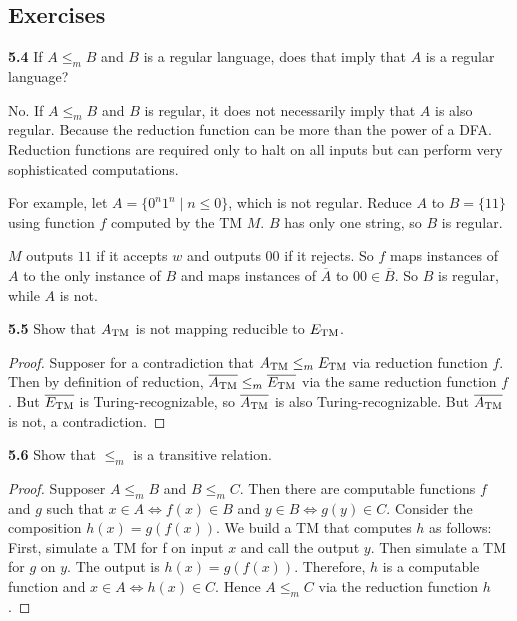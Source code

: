 \subsection{Exercises}

\textbf{5.4} If $A \leq_m B$ and $B$ is a regular language, does that imply that $A$ is a regular language?
\begin{mdframed}
No. If $A \leq_m B$ and $B$ is regular, it does not necessarily imply that $A$ is also regular. Because the reduction function can be more than the power of a DFA. Reduction functions are required only to halt on all inputs but can perform very sophisticated computations.

For example, let $A = \{0^n 1^n \mid n \leq 0\}$, which is not regular. Reduce $A$ to $B = \{11\}$ using function $f$ computed by the TM $M$. $B$ has only one string, so $B$ is regular.

$M$ outputs $11$ if it accepts $w$ and outputs $00$ if it rejects. So $f$ maps instances of $A$ to the only instance of $B$ and maps instances of $\overline{A}$ to $00 \in \overline{B}$. So $B$ is regular, while $A$ is not.
\end{mdframed}

\textbf{5.5} Show that $A_{\text{TM}}$ is not mapping reducible to $E_{\text{TM}}$.

\begin{mdframed}
\begin{proof}
Supposer for a contradiction that $A_{\text{TM}} \leq_m E_{\text{TM}}$ via reduction function $f$. Then by definition of reduction, $\overline{A_{\text{TM}}} \leq_m \overline{E_{\text{TM}}}$ via the same reduction function $f$. But $\overline{E_{\text{TM}}}$ is Turing-recognizable, so $\overline{A_{\text{TM}}}$ is also Turing-recognizable. But $\overline{A_{\text{TM}}}$ is not, a contradiction.
\end{proof}
\end{mdframed}

\textbf{5.6} Show that $\leq_m$ is a transitive relation.

\begin{mdframed}
\begin{proof}
Supposer $A \leq_m B$ and $B\leq_m C$. Then there are computable functions $f$ and $g$ such that $x\in A \Leftrightarrow f(x) \in B$ and $y\in B \Leftrightarrow g(y) \in C$. Consider the composition $h(x) = g(f(x))$. We build a TM that computes $h$ as follows: First, simulate a TM for f on input $x$ and call the output $y$. Then simulate a TM for $g$ on $y$. The output is $h(x) = g(f(x))$. Therefore, $h$ is a computable function and $x\in A \Leftrightarrow h(x) \in C$. Hence $A\leq_m C$ via the reduction function $h$.
\end{proof}
\end{mdframed}

